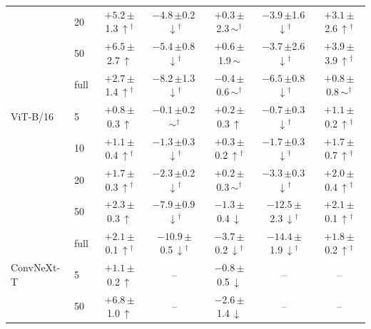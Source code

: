 \begin{table}[htbp]
\begin{tabular}{llccccc}
 & 20 & $+5.2$\,{\scriptsize$\pm$1.3}\,$\uparrow$$^\dagger$ & $-4.8$\,{\scriptsize$\pm$0.2}\,$\downarrow$$^\dagger$ & $+0.3$\,{\scriptsize$\pm$2.3}\,$\sim$$^\dagger$ & $-3.9$\,{\scriptsize$\pm$1.6}\,$\downarrow$$^\dagger$ & $+3.1$\,{\scriptsize$\pm$2.6}\,$\uparrow$$^\dagger$ \\
 & 50 & $+6.5$\,{\scriptsize$\pm$2.7}\,$\uparrow$ & $-5.4$\,{\scriptsize$\pm$0.8}\,$\downarrow$$^\dagger$ & $+0.6$\,{\scriptsize$\pm$1.9}\,$\sim$ & $-3.7$\,{\scriptsize$\pm$2.6}\,$\downarrow$$^\dagger$ & $+3.9$\,{\scriptsize$\pm$3.9}\,$\uparrow$$^\dagger$ \\
 & full & $+2.7$\,{\scriptsize$\pm$1.4}\,$\uparrow$$^\dagger$ & $-8.2$\,{\scriptsize$\pm$1.3}\,$\downarrow$$^\dagger$ & $-0.4$\,{\scriptsize$\pm$0.6}\,$\sim$$^\dagger$ & $-6.5$\,{\scriptsize$\pm$0.8}\,$\downarrow$$^\dagger$ & $+0.8$\,{\scriptsize$\pm$0.8}\,$\sim$$^\dagger$ \\
\addlinespace[2pt]
ViT-B/16 & 5 & $+0.8$\,{\scriptsize$\pm$0.3}\,$\uparrow$ & $-0.1$\,{\scriptsize$\pm$0.2}\,$\sim$$^\dagger$ & $+0.2$\,{\scriptsize$\pm$0.3}\,$\uparrow$ & $-0.7$\,{\scriptsize$\pm$0.3}\,$\downarrow$$^\dagger$ & $+1.1$\,{\scriptsize$\pm$0.2}\,$\uparrow$$^\dagger$ \\
 & 10 & $+1.1$\,{\scriptsize$\pm$0.4}\,$\uparrow$$^\dagger$ & $-1.3$\,{\scriptsize$\pm$0.3}\,$\downarrow$$^\dagger$ & $+0.3$\,{\scriptsize$\pm$0.2}\,$\uparrow$$^\dagger$ & $-1.7$\,{\scriptsize$\pm$0.3}\,$\downarrow$$^\dagger$ & $+1.7$\,{\scriptsize$\pm$0.7}\,$\uparrow$$^\dagger$ \\
 & 20 & $+1.7$\,{\scriptsize$\pm$0.3}\,$\uparrow$$^\dagger$ & $-2.3$\,{\scriptsize$\pm$0.2}\,$\downarrow$$^\dagger$ & $+0.2$\,{\scriptsize$\pm$0.3}\,$\sim$$^\dagger$ & $-3.3$\,{\scriptsize$\pm$0.3}\,$\downarrow$$^\dagger$ & $+2.0$\,{\scriptsize$\pm$0.4}\,$\uparrow$$^\dagger$ \\
 & 50 & $+2.3$\,{\scriptsize$\pm$0.3}\,$\uparrow$ & $-7.9$\,{\scriptsize$\pm$0.9}\,$\downarrow$$^\dagger$ & $-1.3$\,{\scriptsize$\pm$0.4}\,$\downarrow$ & $-12.5$\,{\scriptsize$\pm$2.3}\,$\downarrow$$^\dagger$ & $+2.1$\,{\scriptsize$\pm$0.1}\,$\uparrow$$^\dagger$ \\
 & full & $+2.1$\,{\scriptsize$\pm$0.1}\,$\uparrow$$^\dagger$ & $-10.9$\,{\scriptsize$\pm$0.5}\,$\downarrow$$^\dagger$ & $-3.7$\,{\scriptsize$\pm$0.2}\,$\downarrow$$^\dagger$ & $-14.4$\,{\scriptsize$\pm$1.9}\,$\downarrow$$^\dagger$ & $+1.8$\,{\scriptsize$\pm$0.2}\,$\uparrow$$^\dagger$ \\
\addlinespace[2pt]
ConvNeXt-T & 5 & $+1.1$\,{\scriptsize$\pm$0.2}\,$\uparrow$ & -- & $-0.8$\,{\scriptsize$\pm$0.5}\,$\downarrow$ & -- & -- \\
 & 50 & $+6.8$\,{\scriptsize$\pm$1.0}\,$\uparrow$ & -- & $-2.6$\,{\scriptsize$\pm$1.4}\,$\downarrow$ & -- & -- \\
\bottomrule
\end{tabular}
\end{table}
